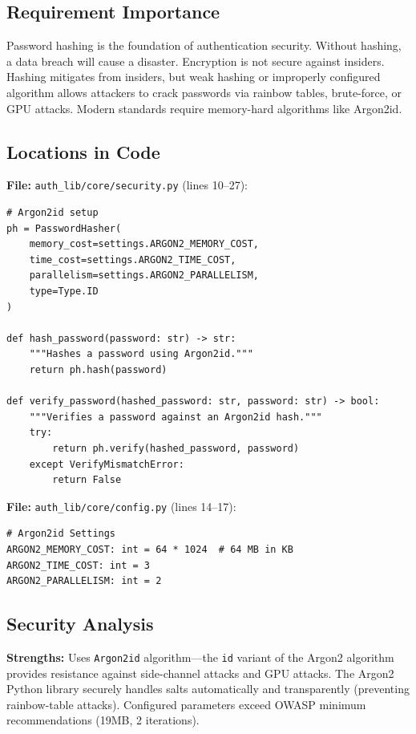 \documentclass[11pt,a4paper]{article}
\begin{document}
\subsection{Requirement Importance}
Password hashing is the foundation of authentication security. Without hashing, a data breach will cause a disaster. Encryption is not secure against insiders. Hashing mitigates from insiders, but weak hashing or improperly configured algorithm allows attackers to crack passwords via rainbow tables, brute-force, or GPU attacks. Modern standards require memory-hard algorithms like Argon2id.

\subsection{Locations in Code}

\textbf{File:} \texttt{auth\_lib/core/security.py} (lines 10--27):
\begin{lstlisting}
# Argon2id setup
ph = PasswordHasher(
    memory_cost=settings.ARGON2_MEMORY_COST,
    time_cost=settings.ARGON2_TIME_COST,
    parallelism=settings.ARGON2_PARALLELISM,
    type=Type.ID
)

def hash_password(password: str) -> str:
    """Hashes a password using Argon2id."""
    return ph.hash(password)

def verify_password(hashed_password: str, password: str) -> bool:
    """Verifies a password against an Argon2id hash."""
    try:
        return ph.verify(hashed_password, password)
    except VerifyMismatchError:
        return False
\end{lstlisting}

\textbf{File:} \texttt{auth\_lib/core/config.py} (lines 14--17):
\begin{lstlisting}
# Argon2id Settings
ARGON2_MEMORY_COST: int = 64 * 1024  # 64 MB in KB
ARGON2_TIME_COST: int = 3
ARGON2_PARALLELISM: int = 2
\end{lstlisting}

\subsection{Security Analysis}

\textbf{Strengths:}
Uses \texttt{Argon2id} algorithm---the \texttt{id} variant of the Argon2 algorithm provides resistance against side-channel attacks and GPU attacks. The Argon2 Python library securely handles salts automatically and transparently (preventing rainbow-table attacks). Configured parameters exceed OWASP minimum recommendations (19MB, 2 iterations).
\end{document}
